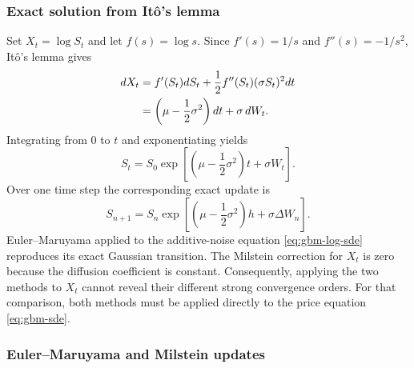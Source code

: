 \subsubsection{Exact solution from It\^o's lemma}

Set $X_t=\log S_t$ and let $f(s)=\log s$.  Since
$f'(s)=1/s$ and $f''(s)=-1/s^2$, It\^o's lemma gives
\begin{align}
    dX_t
      &=f'(S_t)dS_t+\frac12f''(S_t)(\sigma S_t)^2dt \notag\\
      &=\left(\mu-\frac12\sigma^2\right)dt+\sigma\,dW_t.
    \label{eq:gbm-log-sde}
\end{align}
Integrating from $0$ to $t$ and exponentiating yields
\begin{equation}
    S_t=S_0\exp\!\left[
        \left(\mu-\frac12\sigma^2\right)t+\sigma W_t
    \right].
    \label{eq:gbm-exact-solution}
\end{equation}
Over one time step the corresponding exact update is
\begin{equation}
    S_{n+1}=S_n\exp\!\left[
        \left(\mu-\frac12\sigma^2\right)h+\sigma\Delta W_n
    \right].
    \label{eq:gbm-exact-step}
\end{equation}
Euler--Maruyama applied to the additive-noise equation
\eqref{eq:gbm-log-sde} reproduces its exact Gaussian transition.  The Milstein
correction for $X_t$ is zero because the diffusion coefficient is constant.
Consequently, applying the two methods to $X_t$ cannot reveal their different
strong convergence orders.  For that comparison, both methods must be applied
directly to the price equation \eqref{eq:gbm-sde}.

\subsubsection{Euler--Maruyama and Milstein updates}


